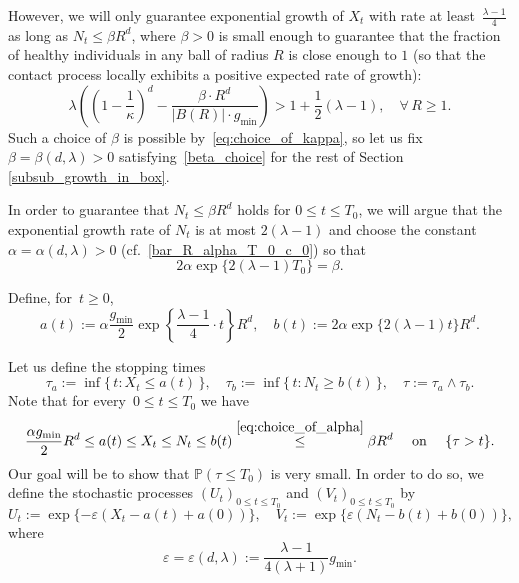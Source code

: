 \documentclass[a4paper,12pt]{article}
\begin{document}
However, we will only guarantee exponential growth of $X_t$ with rate at least~$\frac{\lambda-1}{4}$ as long as
 $N_t \leq \beta R^d$, where $\beta >0$ is small enough to guarantee that the fraction of  healthy individuals  in any ball of radius $R$ is close enough to $1$ (so that
 the contact process locally exhibits a positive expected rate of growth):
 \begin{equation}\label{beta_choice}
 \lambda \left(\left(1- \frac{1}{\kappa}\right)^d - \frac{\beta \cdot R^d}{|B(R)| \cdot g_{\min}}\right) > 1 + \frac12(\lambda - 1), \quad  \forall\,  R \ge 1.
\end{equation}
Such a choice of $\beta$ is possible by~\eqref{eq:choice_of_kappa}, so let us fix $\beta = \beta(d,\lambda)>0$ satisfying~\eqref{beta_choice} for
the rest of Section \ref{subsub_growth_in_box}.

\smallskip

In order to guarantee that $N_t \leq \beta R^d$ holds for $0 \leq t \leq T_0$, we will  argue that the exponential growth rate of $N_t$ is at most $2(\lambda-1)$
and choose the constant $\alpha=\alpha(d,\lambda)>0$ (cf.\  \eqref{bar_R_alpha_T_0_c_0})
 so that
\begin{equation}\label{eq:choice_of_alpha}
2\alpha \exp\{2(\lambda - 1) {T_0}\} = \beta.
\end{equation}

Define, for~$t \geq 0$,
\begin{equation}
\label{eq:def_of_a_and_b}
a(t) := \alpha \frac{ g_{\min}}{2} \exp\left\{\frac{\lambda - 1}{4}\cdot t\right\} R^d ,
\quad
b(t) := 2\alpha  \exp\{2(\lambda - 1)t\} R^d .
\end{equation}


Let us define the stopping times
\begin{equation}\label{tau_def}
\tau_a := \inf\{\, t: X_t \leq a(t) \, \} ,
\quad
\tau_b := \inf\{ \, t: N_t \geq b(t) \, \},
\quad \tau := \tau_a \wedge \tau_b.
\end{equation}
Note that for every~$0 \leq  t \leq {T_0}$ we have
\begin{equation}
\label{eq:condition_on_alpha_beta}
\frac{\alpha g_{\min}}{2} R^d \leq a(t) \leq X_t \leq N_t \leq b(t) \stackrel{ \eqref{eq:choice_of_alpha}  }{\leq } \beta R^d \quad\text{ on } \quad \{\tau > t\}.
\end{equation}
Our goal will be to show that $\mathbb{P}(\tau \leq T_0)$ is very small.
In order to do so, we define the stochastic processes $(U_t)_{0 \leq t \leq {T_0}}$ and $(V_t)_{0 \leq t \leq {T_0}}$ by
\begin{equation}\label{U_t_V_t_def}
 U_t := \exp\{-\varepsilon(X_t - a(t) + a(0))\} ,\quad V_t :=    \exp\{\varepsilon(N_t - b(t) + b(0))\},
\end{equation}
where
\begin{equation}\label{epsilon_choice}
  \varepsilon= \varepsilon(d,\lambda):=\frac{\lambda-1}{4(\lambda+1)} g_{\min}.
\end{equation}
\end{document}
